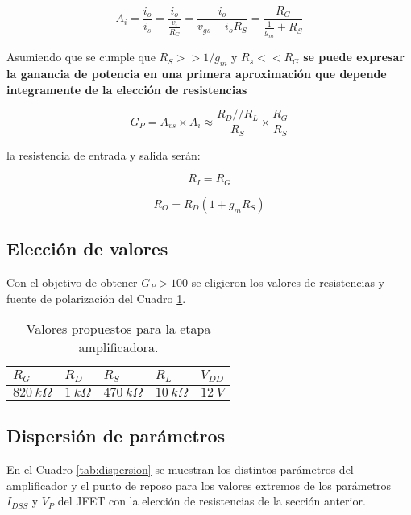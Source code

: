 \documentclass[a4paper, 10pt, spanish]{article}
\begin{document}
\begin{equation}
A_i = \frac{i_o}{i_s} = \frac{i_o}{\frac{v_i}{R_G}} = \frac{i_o}{v_{gs}+i_o R_S} = \frac{R_G}{\frac{1}{g_m}+R_S}
\end{equation}

Asumiendo que se cumple que $R_S >> 1/g_m$ y $R_s << R_G$ \textbf{se puede expresar la ganancia de potencia en una primera aproximación que depende integramente de la elección de resistencias}

\begin{equation}
G_P = A_{vs}\times A_i \approx \frac{R_D//R_L}{R_S} \times \frac{R_G}{R_S}
\end{equation}


la resistencia de entrada y salida serán:

\begin{equation}
R_I = R_G
\end{equation}

\begin{equation}
R_O = R_D(1+g_mR_S)
\end{equation}


\subsection{Elección de valores}

Con el objetivo de obtener $G_P > 100$ se eligieron los valores de resistencias y fuente de polarización del Cuadro \ref{tab:valores}.

\begin{table}[h]
\centering
\begin{tabularx}{0.7\textwidth}{XXXXX}
\hline
 $R_G$  		& $R_D$ 		& $R_S$ 			& $R_L$ 		& $V_{DD}$ \\
 \hline
 $820\ k\Omega$ & $1\ k\Omega$ 	& $470\ k\Omega$ 	& $10\ k\Omega$ & $12\ V$ \\
\hline
\end{tabularx}
\caption{Valores propuestos para la etapa amplificadora.}
\label{tab:valores}
\end{table}



\subsection{Dispersión de parámetros}

En el Cuadro \ref{tab:dispersion} se muestran los distintos parámetros del amplificador y el punto de reposo para los valores extremos de los parámetros $I_{DSS}$ y $V_P$ del JFET con la elección de resistencias de la sección anterior.
\end{document}
